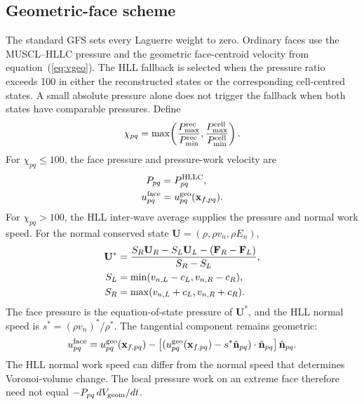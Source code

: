 \documentclass[twocolumn]{aastex63}
\newcommand{\vel}{{u}}
\newcommand{\vect}[1]{\mathbf{#1}}
\begin{document}
\subsection{Geometric-face scheme}
\label{sec:adopted}

The standard GFS sets every Laguerre weight to zero. Ordinary faces use the
MUSCL--HLLC pressure and the geometric face-centroid velocity from
equation~(\ref{eq:vgeo}). The HLL fallback is selected when the pressure ratio
exceeds 100 in either the reconstructed states or the corresponding
cell-centred states. A small absolute pressure alone does not trigger the
fallback when both states have comparable pressures. Define
\begin{equation}
  \chi_{pq}=\max\!\left(
    {P_{\max}^{\rm rec}\over P_{\min}^{\rm rec}},
    {P_{\max}^{\rm cell}\over P_{\min}^{\rm cell}}
  \right).
  \label{eq:extreme}
\end{equation}
For $\chi_{pq}\le100$, the face pressure and pressure-work velocity are
\begin{equation}
  \begin{aligned}
  P_{pq}&=P^{\rm HLLC}_{pq},\\
  \vel_{pq}^{\rm face}&=\vel_{pq}^{\rm geo}(\vect{x}_{f,pq}).
  \end{aligned}
  \label{eq:ordinary}
\end{equation}
For $\chi_{pq}>100$, the HLL inter-wave average supplies the pressure and
normal work speed. For the normal conserved state $\mathbf{U}
=(\rho,\rho v_n,\rho E_n)$,
\begin{equation}
  \begin{aligned}
  \mathbf{U}^{*}
  &={S_R\mathbf{U}_R-S_L\mathbf{U}_L
     -(\mathbf{F}_R-\mathbf{F}_L)\over S_R-S_L},\\
  S_L&=\min(v_{n,L}-c_L,v_{n,R}-c_R),\\
  S_R&=\max(v_{n,L}+c_L,v_{n,R}+c_R).
  \end{aligned}
  \label{eq:hll}
\end{equation}
The face pressure is the equation-of-state pressure of $\mathbf{U}^{*}$, and
the HLL normal speed is $s^{*}=(\rho v_n)^{*}/\rho^{*}$. The tangential
component remains geometric:
\begin{equation}
  \vel_{pq}^{\rm face}
  =\vel_{pq}^{\rm geo}(\vect{x}_{f,pq})
   -\left[(\vel_{pq}^{\rm geo}(\vect{x}_{f,pq})
      -s^{*}\hat{\mathbf n}_{pq})\cdot\hat{\mathbf n}_{pq}\right]
      \hat{\mathbf n}_{pq}.
  \label{eq:vextreme}
\end{equation}
The HLL normal work speed can differ from the normal speed that determines
Voronoi-volume change. The local pressure work on an extreme face therefore
need not equal $-P_{pq}\,dV_{\rm geom}/dt$.
\end{document}
